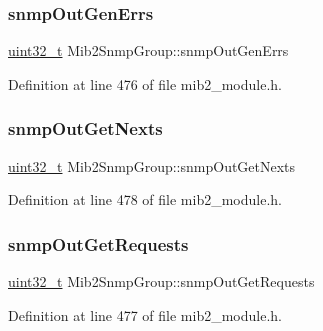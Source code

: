 \mbox{\label{structMib2SnmpGroup_a80d2be41590198a01e101431db8b1901}} 
\subsubsection{\texorpdfstring{snmp\+Out\+Gen\+Errs}{snmpOutGenErrs}}
{\footnotesize\ttfamily \hyperlink{stdint_8h_a435d1572bf3f880d55459d9805097f62}{uint32\+\_\+t} Mib2\+Snmp\+Group\+::snmp\+Out\+Gen\+Errs}



Definition at line 476 of file mib2\+\_\+module.\+h.

\mbox{\label{structMib2SnmpGroup_a49c784966b0d8836d01042a1e939b28b}} 
\subsubsection{\texorpdfstring{snmp\+Out\+Get\+Nexts}{snmpOutGetNexts}}
{\footnotesize\ttfamily \hyperlink{stdint_8h_a435d1572bf3f880d55459d9805097f62}{uint32\+\_\+t} Mib2\+Snmp\+Group\+::snmp\+Out\+Get\+Nexts}



Definition at line 478 of file mib2\+\_\+module.\+h.

\mbox{\label{structMib2SnmpGroup_aa4a9e2f367a745e2f4e73922e13c5238}} 
\subsubsection{\texorpdfstring{snmp\+Out\+Get\+Requests}{snmpOutGetRequests}}
{\footnotesize\ttfamily \hyperlink{stdint_8h_a435d1572bf3f880d55459d9805097f62}{uint32\+\_\+t} Mib2\+Snmp\+Group\+::snmp\+Out\+Get\+Requests}



Definition at line 477 of file mib2\+\_\+module.\+h.

